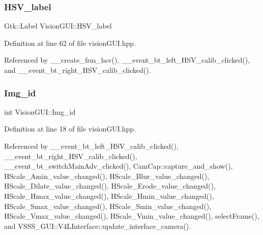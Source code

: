 \subsubsection{\texorpdfstring{H\+S\+V\+\_\+label}{HSV\_label}}
{\footnotesize\ttfamily Gtk\+::\+Label Vision\+G\+U\+I\+::\+H\+S\+V\+\_\+label\hspace{0.3cm}{\ttfamily [private]}}



Definition at line 62 of file vision\+G\+U\+I.\+hpp.



Referenced by \+\_\+\+\_\+create\+\_\+frm\+\_\+hsv(), \+\_\+\+\_\+event\+\_\+bt\+\_\+left\+\_\+\+H\+S\+V\+\_\+calib\+\_\+clicked(), and \+\_\+\+\_\+event\+\_\+bt\+\_\+right\+\_\+\+H\+S\+V\+\_\+calib\+\_\+clicked().

\mbox{\label{class_vision_g_u_i_a4a46f114bc58e0f1d56b655f4bc8f9d8}} 
\subsubsection{\texorpdfstring{Img\+\_\+id}{Img\_id}}
{\footnotesize\ttfamily int Vision\+G\+U\+I\+::\+Img\+\_\+id}



Definition at line 18 of file vision\+G\+U\+I.\+hpp.



Referenced by \+\_\+\+\_\+event\+\_\+bt\+\_\+left\+\_\+\+H\+S\+V\+\_\+calib\+\_\+clicked(), \+\_\+\+\_\+event\+\_\+bt\+\_\+right\+\_\+\+H\+S\+V\+\_\+calib\+\_\+clicked(), \+\_\+\+\_\+event\+\_\+bt\+\_\+switch\+Main\+Adv\+\_\+clicked(), Cam\+Cap\+::capture\+\_\+and\+\_\+show(), H\+Scale\+\_\+\+Amin\+\_\+value\+\_\+changed(), H\+Scale\+\_\+\+Blur\+\_\+value\+\_\+changed(), H\+Scale\+\_\+\+Dilate\+\_\+value\+\_\+changed(), H\+Scale\+\_\+\+Erode\+\_\+value\+\_\+changed(), H\+Scale\+\_\+\+Hmax\+\_\+value\+\_\+changed(), H\+Scale\+\_\+\+Hmin\+\_\+value\+\_\+changed(), H\+Scale\+\_\+\+Smax\+\_\+value\+\_\+changed(), H\+Scale\+\_\+\+Smin\+\_\+value\+\_\+changed(), H\+Scale\+\_\+\+Vmax\+\_\+value\+\_\+changed(), H\+Scale\+\_\+\+Vmin\+\_\+value\+\_\+changed(), select\+Frame(), and V\+S\+S\+S\+\_\+\+G\+U\+I\+::\+V4\+L\+Interface\+::update\+\_\+interface\+\_\+camera().

\mbox{\label{class_vision_g_u_i_a7706a668c306ffcfbb12fbb16e05f478}} 
